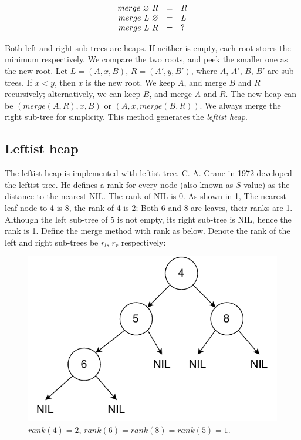 \documentclass[b5paper]{article}
\begin{document}
\[
\begin{array}{rcl}
merge\ \varnothing\ R & = & R \\
merge\ L\ \varnothing & = & L \\
merge\ L\ R & = & ? \\
\end{array}
\]

Both left and right sub-trees are heaps. If neither is empty, each root stores the minimum respectively. We compare the two roots, and peek the smaller one as the new root. Let $L = (A, x, B)$, $R = (A', y, B')$, where $A$, $A'$, $B$, $B'$ are sub-trees. If $x < y$, then $x$ is the new root. We keep $A$, and merge $B$ and $R$ recursively; alternatively, we can keep $B$, and merge $A$ and $R$. The new heap can be $(merge(A, R), x, B)$ or $(A, x, merge(B, R))$. We always merge the right sub-tree for simplicity. This method generates the {\em leftist heap}.

\subsection{Leftist heap}
  

The leftist heap is implemented with leftist tree. C. A. Crane in 1972\cite{wiki-leftist-tree} developed the leftist tree. He defines a rank for every node (also known as $S$-value) as the distance to the nearest NIL. The rank of NIL is 0. As shown in \cref{fig:rank}, The nearest leaf node to 4 is 8, the rank of 4 is 2; Both 6 and 8 are leaves, their ranks are 1. Although the left sub-tree of 5 is not empty, its right sub-tree is NIL, hence the rank is 1. Define the merge method with rank as below. Denote the rank of the left and right sub-trees be $r_l$, $r_r$ respectively:

\begin{figure}[htbp]
  \centering
  \includegraphics[scale=0.6]{img/rank}
  \caption{$rank(4) = 2$, $rank(6) = rank(8) = rank(5) = 1$.}
  \label{fig:rank}
\end{figure}
\end{document}
